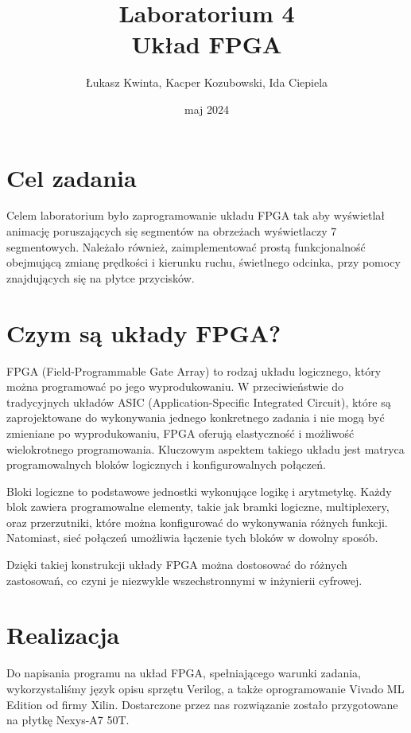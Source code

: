 \documentclass[a4paper]{article}
\title{\fontsize{30pt}{30pt}\selectfont Laboratorium 4 \\ Układ FPGA}
\author{\fontsize{20pt}{20pt}\selectfont Łukasz Kwinta, Kacper Kozubowski, Ida Ciepiela}
\date{maj 2024}
\begin{document}
\maketitle
\pagebreak
\large
\tableofcontents

\pagebreak
\section{Cel zadania}
\Large
Celem laboratorium było zaprogramowanie układu FPGA tak aby wyświetlał animację poruszających się 
segmentów na obrzeżach wyświetlaczy 7 segmentowych. Należało również, zaimplementować prostą funkcjonalność 
obejmującą zmianę prędkości i kierunku ruchu, świetlnego odcinka, przy pomocy znajdujących się na płytce przycisków.  

\section{Czym są układy FPGA?}
FPGA (Field-Programmable Gate Array) to rodzaj układu logicznego,
który można programować po jego wyprodukowaniu. W przeciwieństwie do tradycyjnych układów ASIC (Application-Specific Integrated Circuit), 
które są zaprojektowane do wykonywania jednego konkretnego zadania i nie mogą być zmieniane po wyprodukowaniu, 
FPGA oferują elastyczność i możliwość wielokrotnego programowania. 
Kluczowym aspektem takiego układu jest matryca programowalnych bloków logicznych i konfigurowalnych połączeń.

Bloki logiczne to podstawowe jednostki wykonujące logikę i arytmetykę.
Każdy blok zawiera programowalne elementy, takie jak bramki logiczne,
multiplexery, oraz przerzutniki, które można konfigurować do wykonywania różnych funkcji.
Natomiast, sieć połączeń umożliwia łączenie tych bloków w dowolny sposób.

Dzięki takiej konstrukcji układy FPGA można dostosować do różnych zastosowań, 
co czyni je niezwykle wszechstronnymi w inżynierii cyfrowej.

\pagebreak
\section{Realizacja}
Do napisania programu na układ FPGA, spełniającego warunki zadania, wykorzystaliśmy język opisu sprzętu Verilog, a także
oprogramowanie Vivado ML Edition od firmy Xilin.
Dostarczone przez nas rozwiązanie zostało przygotowane na płytkę Nexys-A7 50T.
\end{document}
